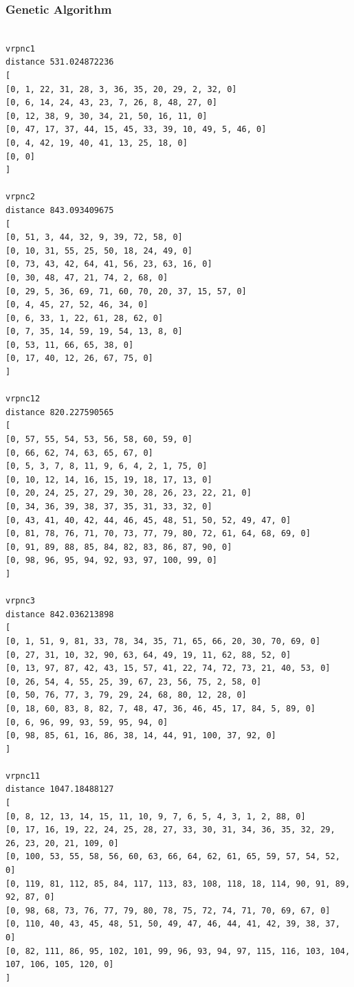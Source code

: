\documentclass{article} %
\begin{document}
\subsubsection{Genetic Algorithm}
\begin{lstlisting}[breaklines, basicstyle=\tiny]

vrpnc1
distance 531.024872236
[
[0, 1, 22, 31, 28, 3, 36, 35, 20, 29, 2, 32, 0]
[0, 6, 14, 24, 43, 23, 7, 26, 8, 48, 27, 0]
[0, 12, 38, 9, 30, 34, 21, 50, 16, 11, 0]
[0, 47, 17, 37, 44, 15, 45, 33, 39, 10, 49, 5, 46, 0]
[0, 4, 42, 19, 40, 41, 13, 25, 18, 0]
[0, 0]
]

vrpnc2
distance 843.093409675
[
[0, 51, 3, 44, 32, 9, 39, 72, 58, 0]
[0, 10, 31, 55, 25, 50, 18, 24, 49, 0]
[0, 73, 43, 42, 64, 41, 56, 23, 63, 16, 0]
[0, 30, 48, 47, 21, 74, 2, 68, 0]
[0, 29, 5, 36, 69, 71, 60, 70, 20, 37, 15, 57, 0]
[0, 4, 45, 27, 52, 46, 34, 0]
[0, 6, 33, 1, 22, 61, 28, 62, 0]
[0, 7, 35, 14, 59, 19, 54, 13, 8, 0]
[0, 53, 11, 66, 65, 38, 0]
[0, 17, 40, 12, 26, 67, 75, 0]
]

vrpnc12
distance 820.227590565
[
[0, 57, 55, 54, 53, 56, 58, 60, 59, 0]
[0, 66, 62, 74, 63, 65, 67, 0]
[0, 5, 3, 7, 8, 11, 9, 6, 4, 2, 1, 75, 0]
[0, 10, 12, 14, 16, 15, 19, 18, 17, 13, 0]
[0, 20, 24, 25, 27, 29, 30, 28, 26, 23, 22, 21, 0]
[0, 34, 36, 39, 38, 37, 35, 31, 33, 32, 0]
[0, 43, 41, 40, 42, 44, 46, 45, 48, 51, 50, 52, 49, 47, 0]
[0, 81, 78, 76, 71, 70, 73, 77, 79, 80, 72, 61, 64, 68, 69, 0]
[0, 91, 89, 88, 85, 84, 82, 83, 86, 87, 90, 0]
[0, 98, 96, 95, 94, 92, 93, 97, 100, 99, 0]
]

vrpnc3
distance 842.036213898
[
[0, 1, 51, 9, 81, 33, 78, 34, 35, 71, 65, 66, 20, 30, 70, 69, 0]
[0, 27, 31, 10, 32, 90, 63, 64, 49, 19, 11, 62, 88, 52, 0]
[0, 13, 97, 87, 42, 43, 15, 57, 41, 22, 74, 72, 73, 21, 40, 53, 0]
[0, 26, 54, 4, 55, 25, 39, 67, 23, 56, 75, 2, 58, 0]
[0, 50, 76, 77, 3, 79, 29, 24, 68, 80, 12, 28, 0]
[0, 18, 60, 83, 8, 82, 7, 48, 47, 36, 46, 45, 17, 84, 5, 89, 0]
[0, 6, 96, 99, 93, 59, 95, 94, 0]
[0, 98, 85, 61, 16, 86, 38, 14, 44, 91, 100, 37, 92, 0]
]

vrpnc11
distance 1047.18488127
[
[0, 8, 12, 13, 14, 15, 11, 10, 9, 7, 6, 5, 4, 3, 1, 2, 88, 0]
[0, 17, 16, 19, 22, 24, 25, 28, 27, 33, 30, 31, 34, 36, 35, 32, 29, 26, 23, 20, 21, 109, 0]
[0, 100, 53, 55, 58, 56, 60, 63, 66, 64, 62, 61, 65, 59, 57, 54, 52, 0]
[0, 119, 81, 112, 85, 84, 117, 113, 83, 108, 118, 18, 114, 90, 91, 89, 92, 87, 0]
[0, 98, 68, 73, 76, 77, 79, 80, 78, 75, 72, 74, 71, 70, 69, 67, 0]
[0, 110, 40, 43, 45, 48, 51, 50, 49, 47, 46, 44, 41, 42, 39, 38, 37, 0]
[0, 82, 111, 86, 95, 102, 101, 99, 96, 93, 94, 97, 115, 116, 103, 104, 107, 106, 105, 120, 0]
]


\end{lstlisting}
\end{document}
